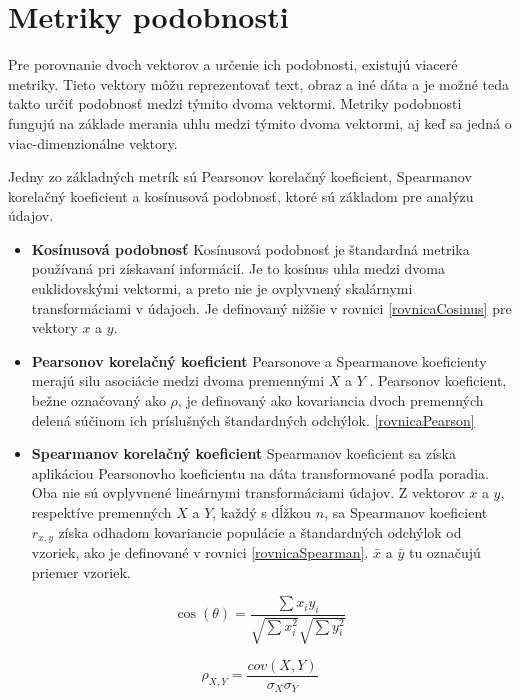 \section{Metriky podobnosti}

Pre porovnanie dvoch vektorov a určenie ich podobnosti, existujú viaceré metriky. Tieto vektory môžu reprezentovať text, obraz a iné dáta a je možné teda takto určiť podobnosť medzi týmito dvoma vektormi. Metriky podobnosti fungujú na základe merania uhlu medzi týmito dvoma vektormi, aj keď sa jedná o viac-dimenzionálne vektory. 

Jedny zo základných metrík sú Pearsonov korelačný koeficient, Spearmanov korelačný koeficient a kosínusová podobnosť, ktoré sú základom pre analýzu údajov.

\begin{itemize}
    \item \textbf{Kosínusová podobnosť} Kosínusová podobnosť je štandardná metrika používaná pri získavaní informácií. Je to kosínus uhla medzi dvoma euklidovskými vektormi, a preto nie je ovplyvnený skalárnymi transformáciami v údajoch. Je definovaný nižšie v rovnici \eqref{rovnicaCosinus} pre vektory \(x\) a \(y\).
    
    \item \textbf{Pearsonov korelačný koeficient} Pearsonove a Spearmanove koeficienty merajú silu asociácie medzi dvoma premennými \(X\) a \(Y\) . Pearsonov koeficient, bežne označovaný ako \(\rho\), je definovaný ako kovariancia dvoch premenných delená súčinom ich príslušných štandardných odchýlok. \eqref{rovnicaPearson}
    
    \item \textbf{Spearmanov korelačný koeficient} Spearmanov koeficient sa získa aplikáciou Pearsonovho koeficientu na dáta transformované podľa poradia. Oba nie sú ovplyvnené lineárnymi transformáciami údajov. Z vektorov \(x\) a \(y\), respektíve premenných \(X\) a \(Y\), každý s dĺžkou \(n\), sa Spearmanov koeficient \(r_{x,y}\) získa odhadom kovariancie populácie a štandardných odchýlok od vzoriek, ako je definované v rovnici \eqref{rovnicaSpearman}. \(\bar{x}\) a \(\bar{y}\) tu označujú priemer vzoriek. \cite{Dongen:2012}
\end{itemize}

\begin{equation}
	\cos(\theta) =  \dfrac{\sum{x_{i}y_{i}}}{\sqrt{\sum{x_{i}^2}}\sqrt{\sum{y_{i}^2}}} \label{rovnicaCosinus}
\end{equation}

\begin{equation}
	\rho_{X,Y} =  \dfrac{cov(X,Y)}{\sigma_{X} \sigma_{Y}} \label{rovnicaPearson}
\end{equation}

